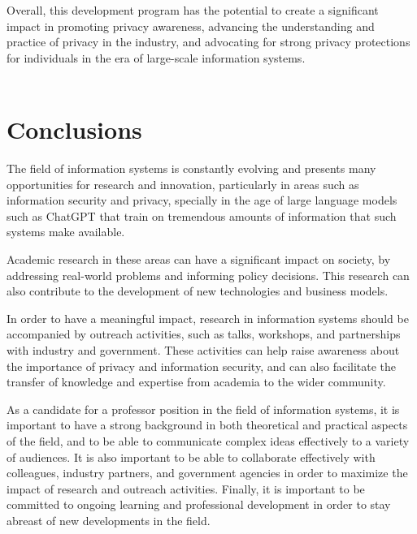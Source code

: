 \documentclass[11pt]{article}
\begin{document}
Overall, this development program has the potential to create a significant impact in promoting privacy awareness, advancing the understanding and practice of privacy in the industry, and advocating for strong privacy protections for individuals in the era of large-scale information systems.\\\\

\section{Conclusions}

The field of information systems is constantly evolving and presents many opportunities for research and innovation, particularly in areas such as information security and privacy, specially in the age of large language models such as ChatGPT that train on tremendous amounts of information that such systems make available.

Academic research in these areas can have a significant impact on society, by addressing real-world problems and informing policy decisions. This research can also contribute to the development of new technologies and business models.

In order to have a meaningful impact, research in information systems should be accompanied by outreach activities, such as talks, workshops, and partnerships with industry and government. These activities can help raise awareness about the importance of privacy and information security, and can also facilitate the transfer of knowledge and expertise from academia to the wider community.

As a candidate for a professor position in the field of information systems, it is important to have a strong background in both theoretical and practical aspects of the field, and to be able to communicate complex ideas effectively to a variety of audiences. It is also important to be able to collaborate effectively with colleagues, industry partners, and government agencies in order to maximize the impact of research and outreach activities. Finally, it is important to be committed to ongoing learning and professional development in order to stay abreast of new developments in the field.
\end{document}
